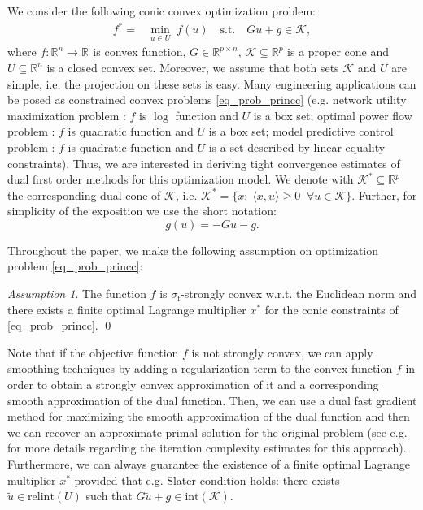 \documentclass{gOMS2e}
\theoremstyle{plain}
\theoremstyle{definition}
\theoremstyle{remark}
\newtheorem{assumption}[theorem]{Assumption}
\begin{document}
We consider the following  conic convex  optimization problem:
\begin{align}
\label{eq_prob_princc} f^* = &\min_{u \in U} \; f(u) \quad
\text{s.t.}  \quad  G u + g \in {\mathcal{K}},
\end{align}
where $f: {\mathbb{R}}^n \to {\mathbb{R}}^{}$ is convex function, $G \in {\mathbb{R}}^{p
\times n}$,  ${\mathcal{K}} \subseteq {\mathbb{R}}^p$ is a proper  cone  and $U
\subseteq {\mathbb{R}}^n$ is a closed convex set. Moreover, we assume that
both sets ${\mathcal{K}}$  and $U$  are simple, i.e. the projection on these
sets is easy.  Many engineering applications can be posed as
constrained convex  problems \eqref{eq_prob_princc} (e.g. network utility maximization
problem \cite{BecNed:14,XiaBoy:06}: $f$ is $\log$ function and $U$
is a box set;  optimal power flow problem \cite{ZimMur:11}: $f$
is quadratic function and $U$ is a box set;  model predictive
control  problem \cite{NecNed:13,NedNec:12,PatBem:12}: $f$ is quadratic
function and $U$ is a set described by linear equality constraints).
Thus, we are interested in deriving tight convergence  estimates
of dual first order methods for this  optimization model.  We denote with
${\mathcal{K}}^*  \subseteq {\mathbb{R}}^p$ the corresponding dual cone of ${\mathcal{K}}$,
i.e. ${\mathcal{K}}^* =\{x: \; \langle x, u \rangle \geq 0 \;\; \forall u \in
{\mathcal{K}}\}$. Further, for simplicity of the exposition we use the short
notation:
\[ g(u) = -Gu - g.   \]

\noindent Throughout the paper, we make the following assumption on
optimization problem \eqref{eq_prob_princc}:
\begin{assumption}
\label{as_strong} The function $f$ is $\sigma_{\mathrm{f}}$-strongly
convex w.r.t. the Euclidean norm and there exists a finite optimal
Lagrange multiplier $x^*$ for the conic constraints of
\eqref{eq_prob_princc}. \qed
\end{assumption}

\noindent Note that if the objective function $f$ is not strongly
convex,  we can apply smoothing techniques by adding a
regularization term to the convex function $f$ in order to obtain a
strongly convex approximation of it and a corresponding smooth
approximation of the dual function. Then, we can use a dual fast
gradient method  for maximizing the smooth approximation of the dual
function and then we can recover an approximate primal solution for
the original problem  (see e.g. \cite{NecSuy:08} for more details
regarding the iteration complexity estimates for this approach).
Furthermore, we can always guarantee the existence of a finite
optimal Lagrange multiplier $x^*$ provided that e.g. Slater
condition holds:  there exists $\tilde u \in \text{relint}(U)$ such
that $G \tilde u + g \in \text{int}({\mathcal{K}})$.
\end{document}
